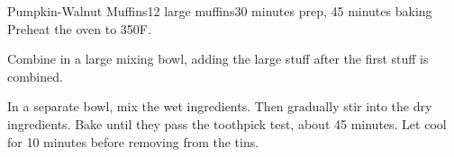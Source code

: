 \documentclass[../Cookbook.tex]{subfiles}
\begin{document}
\begin{recipe}{Pumpkin-Walnut Muffins}{12 large muffins}{30 minutes prep, 45 minutes baking}
Preheat the oven to 350\0F.

Combine in a large mixing bowl, adding the large stuff after the first stuff is combined.

In a separate bowl, mix the wet ingredients.
Then gradually stir into the dry ingredients. Bake until they pass the toothpick test, about 45 minutes. Let cool for 10 minutes before removing from the tins.


\end{recipe}
\end{document}
